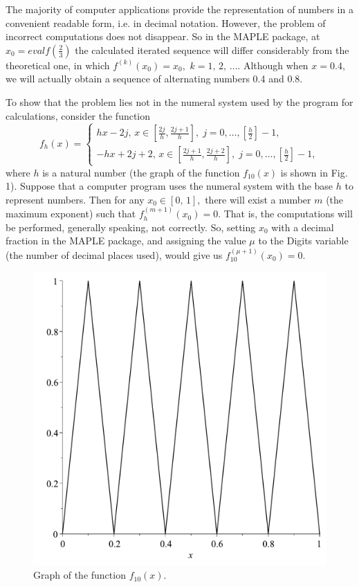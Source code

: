 \documentclass[12pt,a4paper]{amsart}
\begin{document}
The majority of computer applications provide the representation of numbers in a convenient readable form, i.e. in decimal notation. 
However, the problem of incorrect computations does not disappear. So in the MAPLE package, at $x_0=evalf(\frac23)$ the calculated 
iterated sequence will differ considerably from the theoretical one, in which $f^{(k)}(x_0)=x_0,$ $k=1,\,2,\,\ldots$. Although when 
$x=0.4,$ we will actually obtain a sequence of alternating numbers 0.4 and 0.8. 

To show that the problem lies not in the numeral system used by the program for calculations, consider the function
$$f_h(x)=
\left\{\begin{array}{ll}
hx-2j,\,x\in\left[\frac{2j}{h},\frac{2j+1}{h}\right],\;j=0,\ldots,\left[\frac{h}{2}\right]-1, \\
-hx+2j+2,\,x\in\left[\frac{2j+1}{h},\frac{2j+2}{h}\right],\;j=0,\ldots,\left[\frac{h}{2}\right]-1,
\end{array}\right.$$
where $h$ is a natural number (the graph of the function $f_{10}(x)$ is shown in Fig. 1). Suppose that a computer program uses 
the numeral system with the base $h$ to represent numbers. Then for any $x_0\in[0,\,1],$ there will exist a number $m$ (the 
maximum exponent) such that $f_h^{(m+1)}(x_0)=0.$ That is, the computations will be performed, generally speaking, not correctly.
So, setting $x_0$ with a decimal fraction in the MAPLE package, and assigning the value $\mu$ to the Digits variable (the number of 
decimal places used), would give us $f_{10}^{(\mu+1)}(x_0)=0.$

\begin{figure}[h!]
\centering
\includegraphics[scale=0.28]{Fig1}
\caption{Graph of the function $f_{10}(x)$.} \label{f1}
\end{figure}
\end{document}
